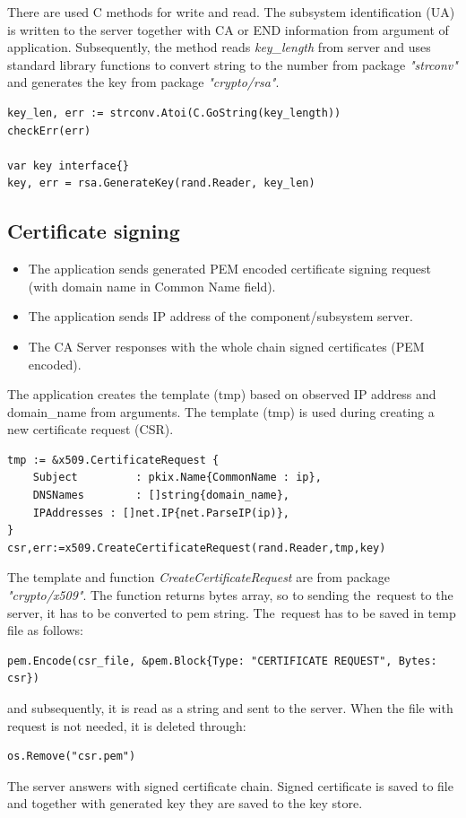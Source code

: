\documentclass[
  twoside, 12pt, 
  printed, %
  notable,   %
  lof,     %
  lot,     %
]{fithesis3}
\begin{document}
There are used C methods for write and read. The subsystem identification (UA) is written to the 
server together with CA or END information from argument of application. Subsequently, the method 
reads \textit{key\_length} from server and uses standard library functions to convert string to the 
number from package \textit{"strconv"} and generates the key from package \textit{"crypto/rsa"}.

\begin{lstlisting}
key_len, err := strconv.Atoi(C.GoString(key_length))	
checkErr(err)

var key interface{}
key, err = rsa.GenerateKey(rand.Reader, key_len)
\end{lstlisting}
    
\subsection{Certificate signing}
\begin{itemize}[leftmargin=2em,rightmargin=1em,itemsep=0.75\parskip,parsep=0em,topsep=0em,partopsep=0em]
\item The application sends generated PEM encoded certificate signing request (with domain name in Common Name field).
\item The application sends IP address of the component/subsystem server.
\item The CA Server responses with the whole chain signed certificates (PEM encoded).
\end{itemize}

The application creates the template (tmp) based on observed IP address and domain\_name from 
arguments. The template (tmp) is used during creating a new certificate request (CSR). 

\begin{lstlisting}
tmp := &x509.CertificateRequest {
	Subject 		: pkix.Name{CommonName : ip},
	DNSNames 		: []string{domain_name},
	IPAddresses : []net.IP{net.ParseIP(ip)},
}
csr,err:=x509.CreateCertificateRequest(rand.Reader,tmp,key)
\end{lstlisting}

The template and function \textit{CreateCertificateRequest} are from package 
\textit{"crypto/x509"}. The function returns bytes array, so to sending the~request to the server, 
it has to be converted to pem string. The~request has to be saved in temp file as follows:
\begin{lstlisting}
pem.Encode(csr_file, &pem.Block{Type: "CERTIFICATE REQUEST", Bytes: csr})
\end{lstlisting}
and subsequently, it is read as a string and sent to the server. When the file with request is not 
needed, it is deleted through:
\begin{lstlisting}
os.Remove("csr.pem")
\end{lstlisting}
The server answers with signed certificate chain. Signed certificate is saved to file and together 
with generated key they are saved to the key store.
\end{document}
